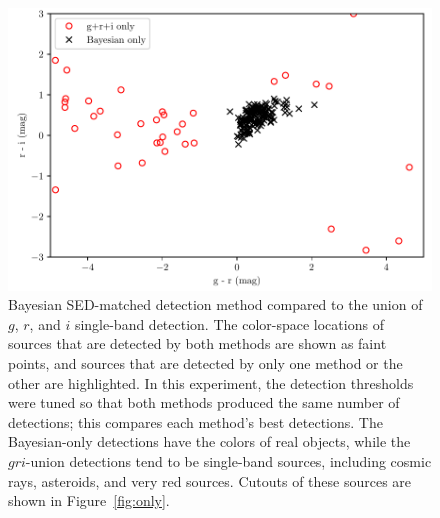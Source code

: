 \documentclass[11pt,letterpaper,linenumbers]{aastex63}
\newcommand{\figref}[1]{\mbox{Figure~\ref{#1}}}
\begin{document}
\begin{figure}
  \begin{center}
    \includegraphics[height=0.4\textwidth]{bayes-vs-gri}
    \caption{Bayesian SED-matched detection method compared to the
      union of $g$, $r$, and $i$ single-band detection.  The
      color-space locations of sources that are detected by both
      methods are shown as faint points, and sources that are detected
      by only one method or the other are highlighted.  In this
      experiment, the detection thresholds were tuned so that both
      methods produced the same number of detections; this compares
      each method's best detections.  The Bayesian-only detections
      have the colors of real objects, while the $gri$-union
      detections tend to be single-band sources, including cosmic
      rays, asteroids, and very red sources.  Cutouts of these sources
      are shown in \figref{fig:only}.
      \label{fig:bayes-vs-gri}}
  \end{center}
\end{figure}
\end{document}
